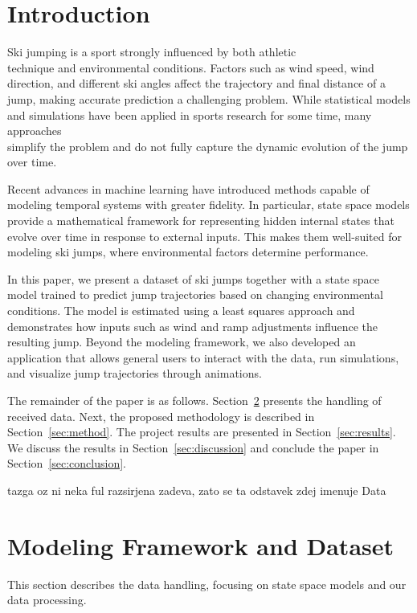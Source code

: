 \documentclass[sigconf,natbib=false, language=english]{acmart}
\begin{document}
\section{Introduction}


Ski jumping is a sport strongly influenced by both athletic \\
technique and environmental conditions.
Factors such as wind speed, wind direction, and different ski angles affect the trajectory 
and final distance of a jump, making accurate prediction a challenging problem. 
While statistical models and simulations have been applied in sports research for 
some time, many approaches\\ simplify the problem and do not fully capture the dynamic 
evolution of the jump over time.

Recent advances in machine learning have introduced methods capable of modeling 
temporal systems with greater fidelity. In particular, state space models provide 
a mathematical framework for representing hidden internal states that evolve over time 
in response to external inputs. This makes them well-suited for modeling ski jumps, 
where environmental factors determine performance.

In this paper, we present a dataset of ski jumps together with a state space model 
trained to predict jump trajectories based on changing environmental conditions. 
The model is estimated using a least squares approach and demonstrates how inputs 
such as wind and ramp adjustments influence the resulting jump. Beyond the modeling 
framework, we also developed an application that allows general users to interact with 
the data, run simulations, and visualize jump trajectories through animations. 

The remainder of the paper is as follows. Section~\ref{sec:data} presents the handling 
of received data. Next, the proposed methodology is described in Section~\ref{sec:method}. 
The project results are presented in Section~\ref{sec:results}. We discuss the results in 
Section~\ref{sec:discussion} and conclude the paper in Section~\ref{sec:conclusion}.

tazga oz ni neka ful razsirjena zadeva, zato se ta odstavek zdej imenuje Data

\section{Modeling Framework and Dataset}\label{sec:data}
This section describes the data handling, focusing on state space models and our 
data processing.
\end{document}
